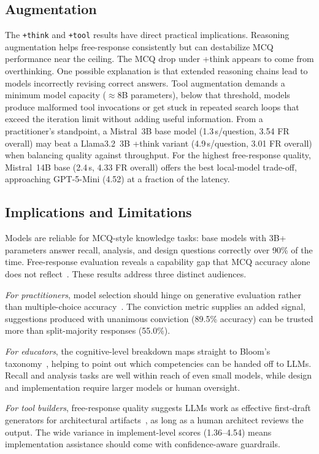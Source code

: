 \documentclass[conference]{IEEEtran}
\begin{document}
\subsection{Augmentation}

The \texttt{+think} and \texttt{+tool} results have direct practical implications. Reasoning augmentation helps free-response consistently but can destabilize MCQ performance near the ceiling. The MCQ drop under +think appears to come from overthinking. One possible explanation is that extended reasoning chains lead to models incorrectly revising correct answers. Tool augmentation demands a minimum model capacity ($\approx$8B parameters), below that threshold, models produce malformed tool invocations or get stuck in repeated search loops that exceed the iteration limit without adding useful information. From a practitioner's standpoint, a Mistral~3B base model (1.3\,s/question, 3.54 FR overall) may beat a Llama3.2~3B +think variant (4.9\,s/question, 3.01 FR overall) when balancing quality against throughput. For the highest free-response quality, Mistral~14B base (2.4\,s, 4.33 FR overall) offers the best local-model trade-off, approaching GPT-5-Mini (4.52) at a fraction of the latency.

\subsection{Implications and Limitations}\label{sec:limitations}

Models are reliable for MCQ-style knowledge tasks: base models with 3B+ parameters answer recall, analysis, and design questions correctly over 90\% of the time. Free-response evaluation reveals a capability gap that MCQ accuracy alone does not reflect~\cite{b24}. These results address three distinct audiences.

\textit{For practitioners}, model selection should hinge on generative evaluation rather than multiple-choice accuracy~\cite{b8}. The conviction metric supplies an added signal, suggestions produced with unanimous conviction (89.5\% accuracy) can be trusted more than split-majority responses (55.0\%).

\textit{For educators}, the cognitive-level breakdown maps straight to Bloom's taxonomy~\cite{b13}, helping to point out which competencies can be handed off to LLMs. Recall and analysis tasks are well within reach of even small models, while design and implementation require larger models or human oversight.

\textit{For tool builders}, free-response quality suggests LLMs work as effective first-draft generators for architectural artifacts~\cite{b12}, as long as a human architect reviews the output. The wide variance in implement-level scores (1.36--4.54) means implementation assistance should come with confidence-aware guardrails.
\end{document}
